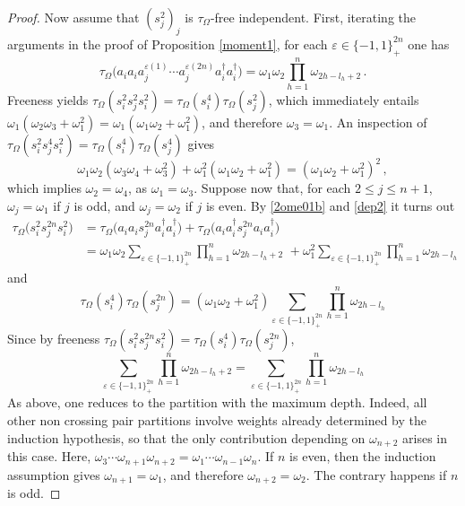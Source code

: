 \documentclass[10pt,a4paper]{amsart}
\def\Om{\Omega}
\def\eps{\varepsilon}
\def\om{\omega} \def\Om{\Omega}
\def\t{\tau}
\begin{document}
\begin{proof}
Now assume that $(s_j^2)_j$ is $\tau_\Om$-free independent. First, iterating the arguments in the proof of Proposition \ref{moment1}, for each $\eps\in\{-1,1\}^{2n}_+$ one has
\begin{equation}\label{dep2}
\t_\Om\big(a_ia_ia^{\eps(1)}_j \cdots a^{\eps(2n)}_j a_i^\dag a_i^\dag\big)=\om_1\om_2\prod_{h=1}^n \om_{2h-l_h+2}\,.
\end{equation}
Freeness yields $\t_\Om(s_i^2s_j^{2}s_i^2)=\t_\Om(s_i^4)\t_\Om(s_j^{2})$, which immediately entails $\om_1(\om_2\om_3+\om_1^2)=\om_1(\om_1\om_2+\om_1^2)$, and therefore $\om_3=\om_1$. An inspection of $\t_\Om(s_i^2s_j^{4}s_i^2)=\t_\Om(s_i^4)\t_\Om(s_j^{4})$ gives
$$
\om_1\om_2(\om_3\om_4+\om_3^2)+\om_1^2(\om_1\om_2+\om_1^2)=(\om_1\om_2+\om_1^2)^2\,,
$$
which implies $\om_2=\om_4$, as $\om_1=\om_3$. Suppose now that, for each $2\leq j\leq n+1$, $\om_j=\om_1$ if $j$ is odd, and $\om_j=\om_{2}$ if $j$ is even. By \eqref{2ome01b} and \eqref{dep2} it turns out
\begin{align*}
\t_\Om\big(s_i^2s_j^{2n}s_i^2\big)&=\t_\Om\big(a_ia_is_j^{2n}a_i^\dag a_i^\dag\big)+\t_\Om\big(a_ia_i^\dag s_j^{2n}a_ia_i^\dag\big)\\
&=\om_1\om_2\sum_{\eps\in\{-1,1\}^{2n}_+}\prod_{h=1}^n \om_{2h-l_h+2}\,\, +\om_1^2\sum_{\eps\in\{-1,1\}^{2n}_+}\prod_{h=1}^n \om_{2h-l_h}
\end{align*}
and
$$
\t_\Om(s_i^4)\t_\Om(s_j^{2n})=(\om_1\om_2+\om_1^2)\sum_{\eps\in\{-1,1\}^{2n}_+}\prod_{h=1}^n \om_{2h-l_h}
$$
Since by freeness $\t_\Om(s_i^2s_j^{2n}s_i^2)=\t_\Om(s_i^4)\t_\Om(s_j^{2n})$,
$$
\sum_{\eps\in\{-1,1\}^{2n}_+}\prod_{h=1}^n \om_{2h-l_h+2}=\sum_{\eps\in\{-1,1\}^{2n}_+}\prod_{h=1}^n \om_{2h-l_h}
$$
As above, one reduces to the partition with the maximum depth. Indeed, all other non crossing pair partitions involve weights already determined by the induction hypothesis, so that the only contribution depending on $\om_{n+2}$ arises in this case. Here, $\om_3\cdots \om_{n+1}\om_{n+2}=\om_1\cdots \om_{n-1}\om_n$. If $n$ is even, then the induction assumption gives $\om_{n+1}=\om_1$, and therefore $\om_{n+2}=\om_2$. The contrary happens if $n$ is odd.
\end{proof}
\end{document}

